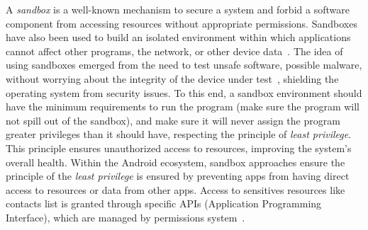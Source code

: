 A \emph{sandbox}
is a well-known mechanism to secure a system and forbid a software component from accessing
resources without appropriate permissions. Sandboxes have also been used to build an isolated
environment within which applications cannot affect other programs, the network, or other device data~\cite{DBLP:journals/peerj-cs/MaassSCS16}. The idea of using sandboxes emerged from the
need to test unsafe software, possible malware, without worrying about the integrity of the
device under test~\cite{DBLP:conf/esorics/BordoniCS17}, shielding the operating system from security issues.
To this end, a sandbox environment should have the minimum requirements to run the
program (make sure the program will not spill out of the sandbox), and make sure it will never
assign the program greater privileges than it should have, respecting the principle of
\emph{least privilege}. This principle ensures unauthorized access to resources,
improving the system's overall health. Within the Android ecosystem, sandbox approaches ensure the principle
of the \emph{least privilege} is ensured by preventing apps from having direct access to resources or data from other apps. Access to sensitives resources
like contacts list is granted through specific APIs (Application Programming Interface),
which are managed by permissions system~\cite{DBLP:journals/corr/abs-2109-06613}. 


